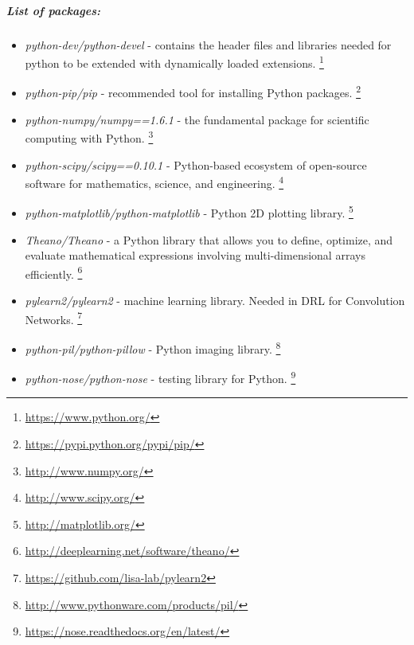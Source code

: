 \documentclass[a4paper,oneside,dvipsnames]{article}
\begin{document}
\subparagraph*{List of packages:}
\begin{itemize}
  \item \textit{python-dev/python-devel} - contains the header files and libraries needed for python to be extended with dynamically loaded extensions. 
    \footnote{\url{https://www.python.org/}}
  \item \textit{python-pip/pip} - recommended tool for installing Python packages. 
    \footnote{\url{https://pypi.python.org/pypi/pip/}}
  \item \textit{python-numpy/numpy==1.6.1} - the fundamental package for scientific computing with Python. 
    \footnote{\url{http://www.numpy.org/}}
  \item \textit{python-scipy/scipy==0.10.1} - Python-based ecosystem of open-source software for mathematics, science, and engineering. 
    \footnote{\url{http://www.scipy.org/}}
  \item \textit{python-matplotlib/python-matplotlib} - Python 2D plotting library. 
    \footnote{\url{http://matplotlib.org/}}
  \item \textit{Theano/Theano} - a Python library that allows you to define, optimize, and evaluate mathematical expressions involving multi-dimensional arrays efficiently. 
    \footnote{\url{http://deeplearning.net/software/theano/}}
  \item \textit{pylearn2/pylearn2} - machine learning library. Needed in DRL for Convolution Networks. 
    \footnote{\url{https://github.com/lisa-lab/pylearn2}}
  \item \textit{python-pil/python-pillow} - Python imaging library. 
    \footnote{\url{http://www.pythonware.com/products/pil/}}
  \item \textit{python-nose/python-nose} - testing library for Python. 
    \footnote{\url{https://nose.readthedocs.org/en/latest/}}
\end{itemize}
\end{document}
